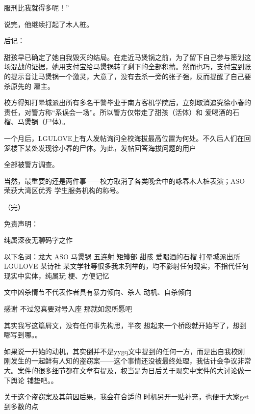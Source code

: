 \documentclass{article}
\begin{document}
服刑比我就得多呢！” 


说完，他继续打起了木人桩。 


后记： 

甜孩早已确定了她自我毁灭的结局。在走近马煲锅之前，为了留下自己参与策划这场混战的证据，她用支付宝给马煲锅转了剩下的全部积蓄。然而也巧，支付宝到账的提示音让马煲锅一个激灵，大意了，没有去杀一旁的张子强，反而提醒了自己要杀原先的
雇主。 

校方得知打晕城派出所有多名干警毕业于南方客机学院后，立刻取消追究徐小春的责任，对警方称“系误会一场”。所以警方仅带走了甜孩（活体）和
爱喝酒的石榴、马煲锅（尸体）。 

一个月后，LGULOVE上有人发帖询问全校海拔最高位置为何处。不久后人们在回笼楼下某处发现徐小春的尸体。为此，发帖回答海拔问题的用户
\newpage

全部被警方调查。 

当然，最重要的还是两件事——校方取消了各类晚会中的咏春木人桩表演；ASO荣获大湾区优秀
学生服务机构的称号。 


（完） 


免责声明： 


纯属深夜无聊码字之作 

以下名词：龙大 ASO 马煲锅 五连射 矩矱部 甜孩 爱喝酒的石榴 打晕城派出所 LGULOVE 某诗社 某文学社等很多我未列举的，均不影射任何现实，不指代任何现实中实体，纯属玩
梗、方便记忆 

文中凶杀情节不代表作者具有暴力倾向、杀人
动机、自杀倾向 

\newpage

感谢 不过您真要对号入座 那就如您所愿吧

其实我写这篇屑文，没有任何事先构思，半夜
想起来一个桥段就开始写了，想到哪写到哪。。 

如果说一开始的动机，其实倒并不是yygq文中提到的任何一方，而是出自我校刚刚发生的一起鲜有人知的盗窃案——这个事情还没被最终处理，我估计会争议非常大。案件的很多细节都在文章有提及，权当是为日后关于现实中案件的大讨论做一下舆论
铺垫吧。。 

关于这个盗窃案及其前因后果，我会在合适的
时机另开一贴补充，也便于大家get到多数的点 
\end{document}
